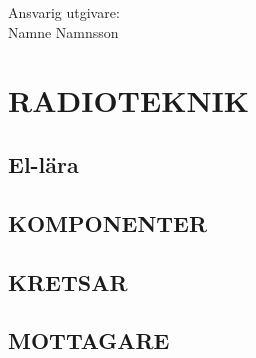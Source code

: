 \documentclass[a4paper,twoside,twocolumn,openright]{book}
\begin{document}
\noindent
Ansvarig utgivare:\\
Namne Namnsson

\cleardoublepage
\pagestyle{fancy}
\twocolumn


\tableofcontents

\setlength{\parindent}{0px}
\setlength{\parskip}{1ex plus 0.5ex minus 0.2ex}

\mainmatter

%




\part{RADIOTEKNIK}
\chapter{El-lära}












\chapter{KOMPONENTER}










\chapter{KRETSAR}










\chapter{MOTTAGARE}









\end{document}
